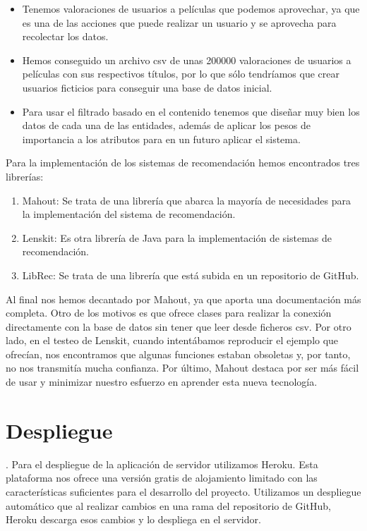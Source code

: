 \begin{itemize}
    \item Tenemos valoraciones de usuarios a películas que podemos aprovechar, ya que es una de las acciones que puede realizar un usuario y se aprovecha para recolectar los datos.
    \item Hemos conseguido un archivo csv de unas 200000 valoraciones de usuarios a películas con sus respectivos títulos, por lo que sólo tendríamos que crear usuarios ficticios para conseguir una base de datos inicial.
    \item Para usar el filtrado basado en el contenido tenemos que diseñar muy bien los datos de cada una de las entidades, además de aplicar los pesos de importancia a los atributos para en un futuro aplicar el sistema.  
\end{itemize} 
Para la implementación de los sistemas de recomendación hemos encontrados tres librerías:
\begin{enumerate}
    \item Mahout: Se trata de una librería que abarca la mayoría de necesidades para la implementación del sistema de recomendación.
    \item Lenskit: Es otra librería de Java para la implementación de sistemas de recomendación.
    \item LibRec: Se trata de una librería que está subida en un repositorio de GitHub.
\end{enumerate}

Al final nos hemos decantado por Mahout, ya que aporta una documentación más completa. Otro de los motivos es que ofrece clases para realizar la conexión directamente con la base de datos 
sin tener que leer desde ficheros csv. Por otro lado, en el testeo de 
Lenskit, cuando intentábamos reproducir el ejemplo que ofrecían, nos encontramos que algunas funciones estaban 
obsoletas y, por tanto, no nos transmitía mucha confianza. Por último, Mahout destaca por ser más fácil de usar y minimizar nuestro esfuerzo en aprender esta nueva tecnología.
\section{Despliegue}. 
\label{makereference4.6}
Para el despliegue de la aplicación de servidor utilizamos Heroku.
Esta plataforma nos ofrece una versión gratis de alojamiento limitado con las
 características suficientes para el desarrollo del proyecto.
Utilizamos un despliegue automático que al realizar cambios en una rama del
 repositorio de GitHub, Heroku descarga esos cambios y lo despliega en el servidor.


